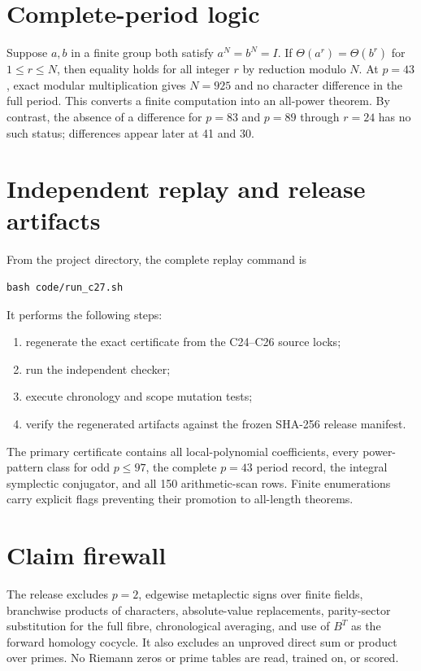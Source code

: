 \section{Complete-period logic}

Suppose \(a,b\) in a finite group both satisfy \(a^N=b^N=I\).  If
\(\Theta(a^r)=\Theta(b^r)\) for \(1\le r\le N\), then equality holds for
all integer \(r\) by reduction modulo \(N\).  At \(p=43\), exact modular
multiplication gives \(N=925\) and no character difference in the full
period.  This converts a finite computation into an all-power theorem.  By
contrast, the absence of a difference for \(p=83\) and \(p=89\) through
\(r=24\) has no such status; differences appear later at 41 and 30.

\section{Independent replay and release artifacts}

From the project directory, the complete replay command is
\begin{verbatim}
bash code/run_c27.sh
\end{verbatim}
It performs the following steps:
\begin{enumerate}
\item regenerate the exact certificate from the C24--C26 source locks;
\item run the independent checker;
\item execute chronology and scope mutation tests;
\item verify the regenerated artifacts against the frozen SHA-256 release
manifest.
\end{enumerate}

The primary certificate contains all local-polynomial coefficients, every
power-pattern class for odd \(p\le97\), the complete \(p=43\) period record,
the integral symplectic conjugator, and all 150 arithmetic-scan rows.  Finite
enumerations carry explicit flags preventing their promotion to all-length
theorems.

\section{Claim firewall}

The release excludes \(p=2\), edgewise metaplectic signs over finite fields,
branchwise products of characters, absolute-value replacements, parity-sector
substitution for the full fibre, chronological averaging, and use of
\(B^T\) as the forward homology cocycle.  It also excludes an unproved direct
sum or product over primes.  No Riemann zeros or prime tables are read,
trained on, or scored.
